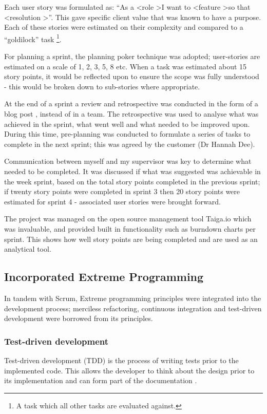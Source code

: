 Each user story was formulated as: ``As a \textless role \textgreater I want to \textless feature \textgreater so that \textless resolution \textgreater''. This gave specific client value that was known to have a purpose. Each of these stories were estimated on their complexity and compared to a ``goldilock'' task \footnote{A task which all other tasks are evaluated against.}.

For planning a sprint, the planning poker \cite{citeulike:14014357} technique was adopted; user-stories are estimated on a scale of 1, 2, 3, 5, 8 etc. When a task was estimated about 15 story points, it would be reflected upon to ensure the scope was fully understood - this would be broken down to sub-stories where appropriate.

At the end of a sprint a review and retrospective was conducted in the form of a blog post \cite{citeulike:14014367}, instead of in a team. The retrospective was used to analyse what was achieved in the sprint, what went well and what needed to be improved upon. During this time, pre-planning was conducted to formulate a series of tasks to complete in the next sprint; this was agreed by the customer (Dr Hannah Dee).

Communication between myself and my supervisor was key to determine what needed to be completed. It was discussed if what was suggested was achievable in the week sprint, based on the total story points completed in the previous sprint; if twenty story points were completed in sprint 3 then 20 story points were estimated for sprint 4 - associated user stories were brought forward.

The project was managed on the open source management tool Taiga.io \cite{citeulike:14014360} which was invaluable, and provided built in functionality such as burndown charts per sprint. This shows how well story points are being completed and are used as an analytical tool.

\subsection{Incorporated Extreme Programming}
In tandem with Scrum, Extreme programming \cite{citeulike:13915786} principles were integrated into the development process; merciless refactoring, continuous integration and test-driven development were borrowed from its principles.

\subsubsection{Test-driven development}
Test-driven development (TDD) is the process of writing tests prior to the implemented code. This allows the developer to think about the design prior to its implementation and can form part of the documentation \cite{citeulike:14014361}.

